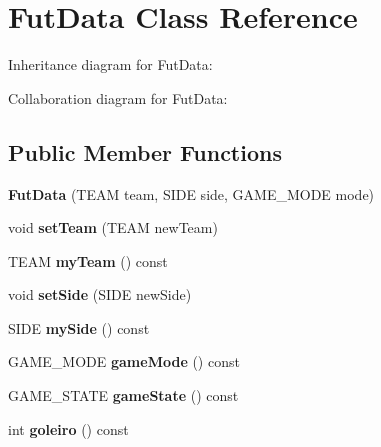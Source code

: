 \hypertarget{classFutData}{}\section{Fut\+Data Class Reference}
\label{classFutData}


Inheritance diagram for Fut\+Data\+:


Collaboration diagram for Fut\+Data\+:
\subsection*{Public Member Functions}
\begin{DoxyCompactItemize}
\item 
{\bfseries Fut\+Data} (T\+E\+AM team, S\+I\+DE side, G\+A\+M\+E\+\_\+\+M\+O\+DE mode)\hypertarget{classFutData_aff08a130d6528ddae5a4a08ee414a402}{}\label{classFutData_aff08a130d6528ddae5a4a08ee414a402}

\item 
void {\bfseries set\+Team} (T\+E\+AM new\+Team)\hypertarget{classFutData_aea6ee036d86ec93a885fcd867084b704}{}\label{classFutData_aea6ee036d86ec93a885fcd867084b704}

\item 
T\+E\+AM {\bfseries my\+Team} () const \hypertarget{classFutData_ac6395ab442576c0735396bd939e27c87}{}\label{classFutData_ac6395ab442576c0735396bd939e27c87}

\item 
void {\bfseries set\+Side} (S\+I\+DE new\+Side)\hypertarget{classFutData_a65d41a5ae7d3a650c4d58321dc431bda}{}\label{classFutData_a65d41a5ae7d3a650c4d58321dc431bda}

\item 
S\+I\+DE {\bfseries my\+Side} () const \hypertarget{classFutData_ad830890219223a2650c006e527c3c0c8}{}\label{classFutData_ad830890219223a2650c006e527c3c0c8}

\item 
G\+A\+M\+E\+\_\+\+M\+O\+DE {\bfseries game\+Mode} () const \hypertarget{classFutData_a5fcecc89518a33a2ae739deefff4e847}{}\label{classFutData_a5fcecc89518a33a2ae739deefff4e847}

\item 
G\+A\+M\+E\+\_\+\+S\+T\+A\+TE {\bfseries game\+State} () const \hypertarget{classFutData_a20714b1ad7fb03444af7647440ea7b6f}{}\label{classFutData_a20714b1ad7fb03444af7647440ea7b6f}

\item 
int {\bfseries goleiro} () const \hypertarget{classFutData_a53bb1499775597c2bcc73316048e0ba5}{}\label{classFutData_a53bb1499775597c2bcc73316048e0ba5}


\end{DoxyCompactItemize}
